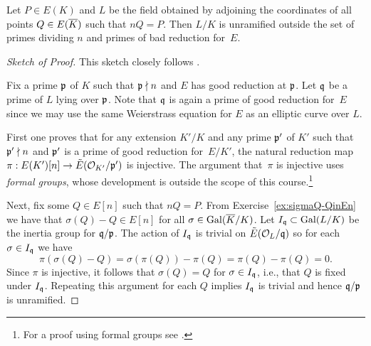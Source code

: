 \begin{theorem}\label{thm:mwunram}
	Let $P\in E(K)$ and $L$ be the field obtained by adjoining the
	coordinates of all points $Q \in E(\overline{K})$ such that $nQ = P$.
	Then $L/K$ is unramified outside the set of primes
	dividing $n$ and primes of bad reduction for~$E$.
\end{theorem}
\begin{proof}[Sketch of Proof]
	This sketch closely follows \cite[Prop.~VIII.1.5b]{silverman:aec}.

	Fix a prime $\mathfrak{p}$ of $K$ such that $\mathfrak{p} \nmid n$ and $E$ has good
	reduction at $\mathfrak{p}$. Let $\mathfrak{q}$ be a prime of $L$ lying over $\mathfrak{p}$.	
	Note that $\mathfrak{q}$ is again a prime of good reduction for~$E$
	since we may use the same Weierstrass equation for $E$ as an
	elliptic curve over $L$.

	First one proves that for any extension $K'/K$ and any prime $\mathfrak{p}'$ of $K'$
	such that $\mathfrak{p}' \nmid n$ and $\mathfrak{p}'$ is a prime of good reduction for~$E/K'$,
	the natural reduction map $\pi: E(K')[n] \to \tilde{E}(\mathcal{O}_{K'}/\mathfrak{p}')$
	is injective. The argument that~$\pi$ is injective uses
	\emph{formal groups}, whose development is outside the
	scope of this course.\footnote{For a proof using formal groups see 
	\cite[Prop.~VII.3.1b]{silverman:aec}.}

	Next, fix some $Q \in E[n]$ such that $nQ = P$.
	From Exercise~\ref{ex:sigmaQ-QinEn} we have that $\sigma(Q)-Q\in E[n]$ for
	all $\sigma \in \operatorname{Gal}(\overline{K}/K)$. Let $I_{\mathfrak{q}}\subset \operatorname{Gal}(L/K)$
	be the inertia group for $\mathfrak{q}/\mathfrak{p}$. The action of $I_{\mathfrak{q}}$ is trivial on 
	$\tilde{E}(\mathcal{O}_L/\mathfrak{q})$ so for each $\sigma \in I_{\mathfrak{q}}$ we have
	$$
		\pi(\sigma(Q) - Q) = \sigma(\pi(Q)) - \pi(Q) = \pi(Q) - \pi(Q) = 0.
	$$
	Since $\pi$ is injective, it follows that $\sigma(Q) = Q$ for $\sigma\in I_{\mathfrak{q}}$,
	i.e., that $Q$ is fixed under $I_{\mathfrak{q}}$. Repeating this argument for
	each $Q$ implies $I_{\mathfrak{q}}$ is trivial and hence $\mathfrak{q}/\mathfrak{p}$ is unramified.
\end{proof}

